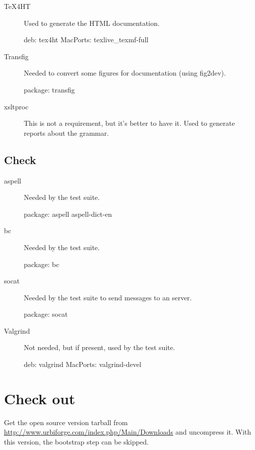 \begin{description}
\item[TeX4HT] Used to generate the HTML documentation.
\begin{package}
deb: tex4ht
MacPorts: texlive_texmf-full
\end{package}

\item[Transfig] Needed to convert some figures for documentation
  (using fig2dev).
\begin{package}
package: transfig
\end{package}

\item[xsltproc] This is not a requirement, but it's better to have it. Used
  to generate reports about the \us grammar.
\end{description}

\subsection{Check}

\begin{description}
\item[aspell] Needed by the test suite.
\begin{package}
package: aspell aspell-dict-en
\end{package}

\item[bc]
  Needed by the test suite.
\begin{package}
package: bc
\end{package}

\item[socat] Needed by the test suite to send messages to an \urbi server.
\begin{package}
package: socat
\end{package}

\item[Valgrind] Not needed, but if present, used by the test suite.
\begin{package}
deb: valgrind
MacPorts: valgrind-devel
\end{package}

\end{description}



\section{Check out}

Get the open source version tarball from
\url{http://www.urbiforge.com/index.php/Main/Downloads} and uncompress it.
With this version, the bootstrap step can be skipped.


